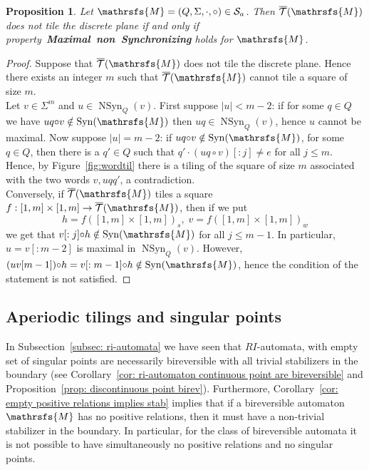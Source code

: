 \documentclass{amsart}
\newtheorem{proposition}[theorem]{Proposition}
\begin{document}
{\begin{proposition}\label{prop: no tiling characterization}
Let ${{{\mathrsfs{{M}}}}}=({{{Q}}},{{{\Sigma}}},{{{\cdot}}},{{{\circ}}})\in{\hbox{${\mathcal S}_{a}$}}$. Then $\overline{\mathcal{T}}({{{\mathrsfs{{M}}}}})$ does not tile the discrete plane if and only if property~{\small\textbf{{Maximal~non~Synchronizing }}} holds for ${{{\mathrsfs{{M}}}}}$.
\end{proposition}
\begin{proof}
Suppose that $\overline{\mathcal{T}}({{{\mathrsfs{{M}}}}})$ does not tile the discrete plane. Hence there exists an integer $m$ such that $\overline{\mathcal{T}}({{{\mathrsfs{{M}}}}})$ cannot tile a square of size $m$. 
\\
Let $v \in {{{\Sigma}}}^{m}$ and $u \in \operatorname{N\operatorname{Syn}}_{{{Q}}}(v)$. First suppose $|u|<m-2$: if for some $q \in {{{Q}}}$ we have $uq{{{\circ}}} v\notin \operatorname{Syn}({{{\mathrsfs{{M}}}}})$ then $uq \in \operatorname{N\operatorname{Syn}}_{{{Q}}}(v)$, hence $u$ cannot be maximal. Now suppose $|u|=m-2$:
 if $uq {{{\circ}}} v\notin \operatorname{Syn}({{{\mathrsfs{{M}}}}})$, for some~$q\in {{{Q}}}$, then there is a $q'\in {{{Q}}}$ such that $q'{{{\cdot}}} (uq{{{\circ}}} v)[:j]\neq e$ for all $j\le m$. Hence, by Figure~\ref{fig:wordtil} there is a tiling of the square of size $m$ associated with the two words $v,uqq'$, a contradiction.
\\
Conversely, if $\overline{\mathcal{T}}({{{\mathrsfs{{M}}}}})$ tiles a square $f:[1,m]\times [1,m]\rightarrow \overline{\mathcal{T}}({{{\mathrsfs{{M}}}}})$, then if we put
$$
h=f\left([1,m]\times [1,m]\right)_{s}, \;v=f\left([1,m]\times [1,m]\right)_{w}
$$
we get that $v[:j]{{{\circ}}} h\notin \operatorname{Syn}({{{\mathrsfs{{M}}}}})$ for all $ j\le m-1$. In particular,  $u=v[:m-2]$  is maximal in $\operatorname{N\operatorname{Syn}}_{{{Q}}}(v)$. However, $(u v[m-1]){{{\circ}}} h=v[:m-1]{{{\circ}}} h \notin \operatorname{Syn}({{{\mathrsfs{{M}}}}})$, hence the condition of the statement is not satisfied.
\end{proof}

\subsection{Aperiodic tilings and singular points}

In Subsection~\ref{subsec: ri-automata} we have seen that $RI$-automata, with empty set of singular points are necessarily bireversible with all trivial stabilizers in the boundary (see Corollary~\ref{cor: ri-automaton continuous point are bireversible} and Proposition~\ref{prop: discontinuous point birev}). Furthermore, Corollary~\ref{cor: empty positive relations implies stab} implies that if a bireversible automaton~${{{\mathrsfs{{M}}}}}$ has no positive relations, then it must have a non-trivial stabilizer in the boundary. In particular, for the class of bireversible automata it is not possible to have simultaneously no positive relations and no singular points. \medskip

}
\end{document}

